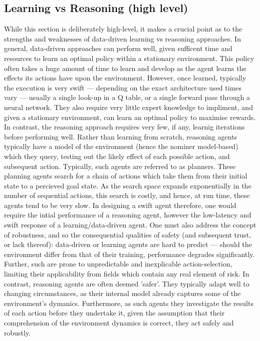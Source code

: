 \subsection{Learning vs Reasoning (high level)}
While this section is deliberately high-level, it makes a crucial point as to the strengths and weaknesses of data-driven learning vs reasoning approaches. 
In general, data-driven approaches can perform well, given sufficent time and resources to learn an optimal policy within a stationary environment. This policy often takes a huge amount of time to learn and develop as the agent learns the effects its actions have upon the environment. However, once learned, typically the execution is very swift --- depending on the exact architecture used times vary --- usually a single look-up in a Q table, or a single forward pass through a neural network. They also require very little expert knowledge to impliment, and given a stationary environment, can learn an optimal policy to maximise rewards. 
\newline \newline
In contrast, the reasoning approach requires very few, if any, learnig iterations before performing well. Rather than learning from scratch, reasoning agents typically have a model of the environment (hence the nominer model-based) which they query, testing out the likely effect of each possible action, and subsequent action. Typically, such agents are referred to as planners. These planning agents search for a chain of actions which take them from their initial state to a percieved goal state. As the search space expands exponentially in the number of sequential actions, this search is costly, and hence, at run time, these agents tend to be very slow. 
\newline\newline
In designing a swift agent therefore, one would require the intial performance of a reasoning agent, however the low-latency and swift response of a learning/data-driven agent. 
\newline \newline
One must also address the concept of robustness, and so the consequential qualities of safety (and subsequent trust, or lack thereof): data-driven or learning agents are hard to predict --- should the environment differ from that of their training, performance degrades significantly. 
Further, such are prone to unpredictable and inexplicable action-selection, limiting their applicability from fields which contain any real element of risk. In contrast, reasoning agents are often deemed 'safer'. 
They typically adapt well to changing circumstances, as their internal model already captures some of the environment's dymanics. 
Furthermore, as such agents they investigate the results of each action before they undertake it, given the assumption that their comprehension of the environment dynamics is correct, they act safely and robustly.




